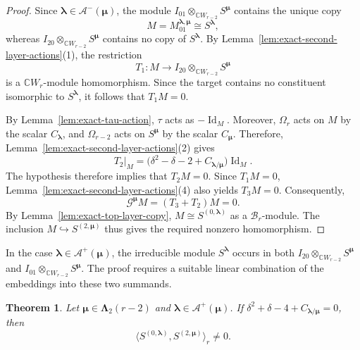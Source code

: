 \documentclass[10pt,a4paper]{amsart}
\newtheorem{theorem}{Theorem}[section]
\newcommand{\C}{\mathbb{C}}
\newcommand{\1}{\mathfrak{1}}
\newcommand{\B}{\mathcal{B}}
\begin{document}
\begin{proof}
Since $\bm\lambda\in\mathcal A^-(\bm\mu)$, the module
$I_{01}\otimes_{\C W_{r-2}}S^{\bm\mu}$ contains the unique copy
$$
M=M_{01}^{\bm\lambda,\bm\mu}\cong S^{\bm\lambda},
$$
whereas $I_{20}\otimes_{\C W_{r-2}}S^{\bm\mu}$ contains
no copy of $S^{\bm\lambda}$.
By Lemma~\ref{lem:exact-second-layer-actions}(1), the restriction
$$
T_1:M\longrightarrow I_{20}\otimes_{\C W_{r-2}}S^{\bm\mu}
$$
is a $\C W_r$-module homomorphism.
Since the target contains no constituent isomorphic to
$S^{\bm\lambda}$, it follows that $T_1M=0$.

By Lemma~\ref{lem:exact-tau-action}, $\tau$ acts as
$-\operatorname{Id}_M$.
Moreover, $\Omega_r$ acts on $M$ by the scalar
$C_{\bm\lambda}$, and $\Omega_{r-2}$ acts on
$S^{\bm\mu}$ by the scalar $C_{\bm\mu}$.
Therefore, Lemma~\ref{lem:exact-second-layer-actions}(2) gives
\begin{equation}\label{eq:exact-T2-minus}
T_2|_M=
\bigl(\delta^2-\delta-2+C_{\bm\lambda/\bm\mu}\bigr)
\operatorname{Id}_M.
\end{equation}
The hypothesis therefore implies that $T_2M=0$.
Since $T_1M=0$, Lemma~\ref{lem:exact-second-layer-actions}(4)
also yields $T_3M=0$.
Consequently,
$$
\mathcal G^{\bm\mu}M=(T_3+T_2)M=0.
$$
By Lemma~\ref{lem:exact-top-layer-copy},
$M\cong S^{(0,\bm\lambda)}$ as a $\B_r$-module.
The inclusion $M\hookrightarrow S^{(2,\bm\mu)}$ thus gives
the required nonzero homomorphism.
\end{proof}

In the case $\bm\lambda\in\mathcal A^+(\bm\mu)$,
the irreducible module $S^{\bm\lambda}$ occurs in both
$I_{20}\otimes_{\C W_{r-2}}S^{\bm\mu}$ and
$I_{01}\otimes_{\C W_{r-2}}S^{\bm\mu}$.
The proof requires a suitable linear combination of the embeddings into these two summands.

\begin{theorem}\label{thm:exact-converse-plus}
Let $\bm\mu\in\bm\Lambda_2(r-2)$ and
$\bm\lambda\in\mathcal A^+(\bm\mu)$.
If $\delta^2+\delta-4+C_{\bm\lambda/\bm\mu}=0$, then
$$
\langle S^{(0,\bm\lambda)},
S^{(2,\bm\mu)}\rangle_r\neq0.
$$
\end{theorem}
\end{document}
